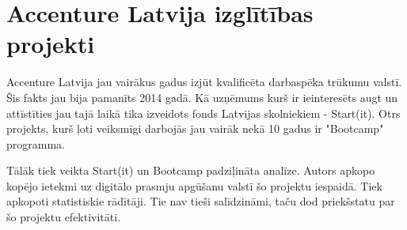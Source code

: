 \section{Accenture Latvija izglītības projekti}
Accenture Latvija jau vairākus gadus izjūt kvalificēta darbaspēka trūkumu valstī. Šis fakts jau bija pamanīts
2014 gadā. Kā uzņēmums kurš ir ieinteresēts augt un attīstīties jau tajā laikā tika izveidots fonds Latvijas
skolniekiem - Start(it). Otrs projekts, kurš ļoti veiksmīgi darbojās jau vairāk nekā 10 gadus ir "Bootcamp" programma.
\par
Tālāk tiek veikta Start(it) un Bootcamp padziļināta analīze. Autors apkopo kopējo ietekmi uz digitālo
prasmju apgūšanu valstī šo projektu iespaidā. Tiek apkopoti statistiskie rādītāji. Tie nav tieši salīdzināmi,
taču dod priekšstatu par šo projektu efektivitāti.
